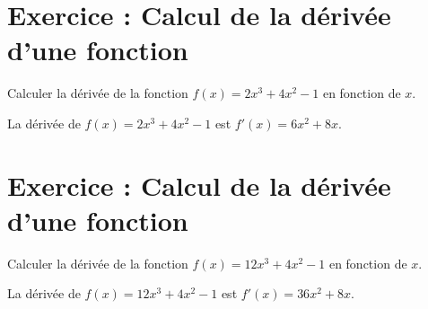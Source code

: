 \documentclass[a4paper, 12pt]{article}
\newenvironment{Exercice}[1][]{
    \section*{Exercice : #1}
}{}
\newenvironment{Correction}[1]{
}{}
\begin{document}
\begin{Exercice}[Calcul de la dérivée d'une fonction]
    Calculer la dérivée de la fonction $f(x) = 2x^3 + 4x^2 - 1$ en fonction de $x$.

    \begin{Correction}{exercice_1_correction.pdf}
        La dérivée de $f(x) = 2x^3 + 4x^2 - 1$ est $f'(x) = 6x^2 + 8x$.
    \end{Correction}
\end{Exercice}


\begin{Exercice}[Calcul de la dérivée d'une fonction]
    Calculer la dérivée de la fonction $f(x) = 12x^3 + 4x^2 - 1$ en fonction de $x$.

    \begin{Correction}{exercice_2_correction.pdf}
        La dérivée de $f(x) = 12x^3 + 4x^2 - 1$ est $f'(x) = 36x^2 + 8x$.
    \end{Correction}
\end{Exercice}
\end{document}

